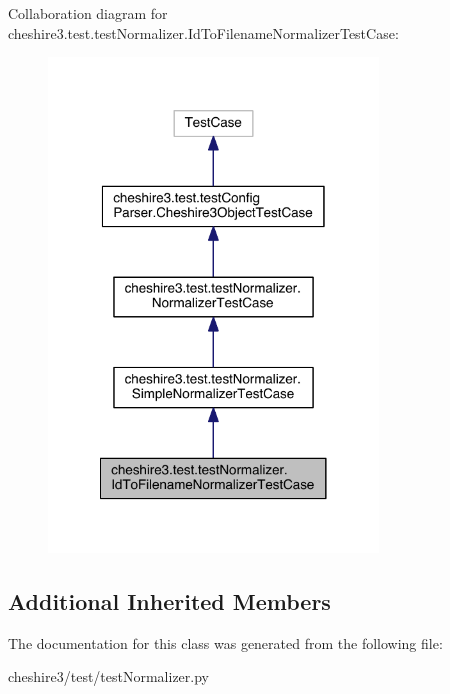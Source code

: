 Collaboration diagram for cheshire3.\-test.\-test\-Normalizer.\-Id\-To\-Filename\-Normalizer\-Test\-Case\-:
\nopagebreak
\begin{figure}[H]
\begin{center}
\leavevmode
\includegraphics[width=248pt]{classcheshire3_1_1test_1_1test_normalizer_1_1_id_to_filename_normalizer_test_case__coll__graph}
\end{center}
\end{figure}
\subsection*{Additional Inherited Members}


The documentation for this class was generated from the following file\-:\begin{DoxyCompactItemize}
\item 
cheshire3/test/test\-Normalizer.\-py\end{DoxyCompactItemize}
